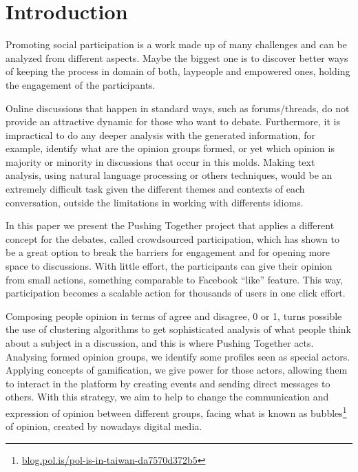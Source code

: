 \documentclass{llncs}
\begin{document}
\section{Introduction}
\label{sec:intro}
  Promoting social participation is a work made up of many challenges and can be
  analyzed from different aspects. Maybe the biggest one is to discover better
  ways of keeping the process in domain of both, laypeople and empowered ones,
  holding the engagement of the participants.

  Online discussions that happen in standard ways, such as forums/threads, do not
  provide an attractive dynamic for those who want to debate. Furthermore, it is
  impractical to do any deeper analysis with the generated information, for example,
  identify what are the opinion groups formed, or yet which opinion is majority
  or minority in discussions that occur in this molds. Making text analysis, using natural
  language processing or others techniques, would be an extremely difficult task
  given the different themes and contexts of each conversation, outside the
  limitations in working with differents idioms.

  In this paper we present the Pushing Together project that applies a different concept for the debates,
  called crowdsourced participation, which has shown to be a great option to break the
  barriers for engagement and for opening more space to discussions. With little
  effort, the participants can give their opinion from small actions,
  something comparable to Facebook ``like'' feature. This way, participation becomes
  a scalable action for thousands of users in one click effort.

  Composing people opinion in terms of agree and disagree, 0 or 1, turns possible
  the use of clustering algorithms to get sophisticated analysis of what people
  think about a subject in a discussion, and this is where Pushing Together acts.
  Analysing formed opinion groups, we identify some profiles seen as special actors.
  Applying concepts of gamification, we give power for those actors, allowing
  them to interact in the platform by creating events and sending direct messages
  to others. With this strategy, we aim to help to change the communication and expression
  of opinion between different groups, facing what is known as
  bubbles\footnote{\url{blog.pol.is/pol-is-in-taiwan-da7570d372b5}} of
  opinion, created by nowadays digital media.

\end{document}
